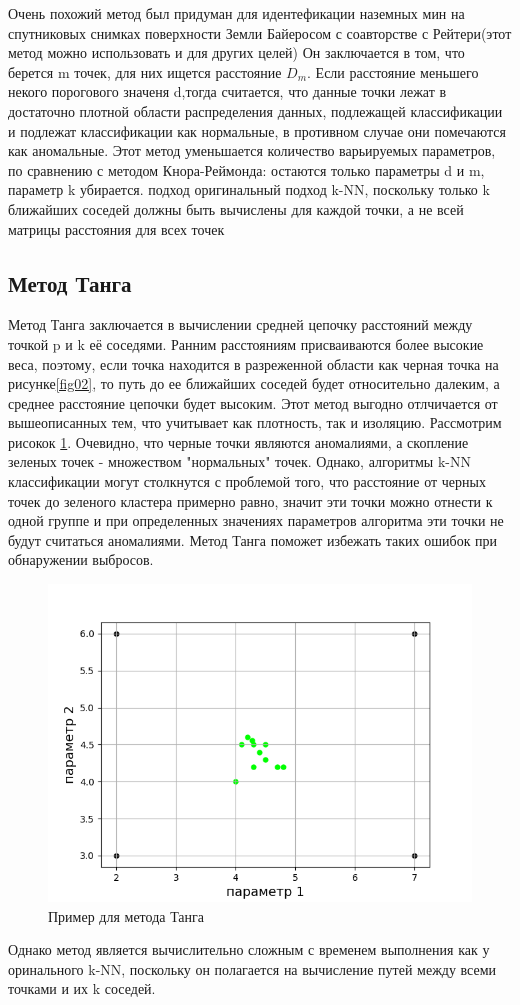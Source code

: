   Очень похожий метод был придуман для идентефикации  наземных мин  на спутниковых снимках поверхности Земли Байеросом с соавторстве с Рейтери\cite{Book10}(этот метод можно использовать и для других целей) Он заключается в том, что берется m точек, для них ищется расстояние $D_m$. Если расстояние меньшего некого порогового значеня d,тогда  считается, что  данные точки лежат в достаточно плотной области распределения данных, подлежащей классификации и подлежат классификации как нормальные, в противном случае они помечаются как аномальные. Этот метод уменьшается количество варьируемых параметров, по сравнению с методом Кнора-Реймонда: остаются только параметры d и m, параметр k убирается. 
  подход оригинальный подход k-NN, поскольку только k ближайших соседей должны быть вычислены для каждой точки, а не всей матрицы расстояния
  для всех точек
\subsection{Метод Танга}
Метод Танга заключается  в вычислении средней цепочку расстояний между точкой p и k её соседями. Ранним расстояниям присваиваются более высокие веса, поэтому, если точка находится в разреженной
области как черная точка на рисунке\ref{fig02}, то путь до  ее ближайших соседей  будет относительно далеким, а среднее расстояние цепочки
будет высоким. Этот метод выгодно отлчичается от вышеописанных тем, что учитывает как  плотность, так и изоляцию. Рассмотрим рисокок \ref{fig03}.
Очевидно, что черные точки являются аномалиями, а скопление зеленых точек - множеством "нормальных" точек. Однако, алгоритмы k-NN классификации могут столкнутся с проблемой того, что расстояние от черных точек до зеленого кластера примерно равно, значит эти точки можно отнести к одной группе и при определенных значениях параметров алгоритма эти точки не будут считаться аномалиями. Метод Танга поможет избежать таких ошибок при обнаружении выбросов.
\begin{figure}
	\centering
	\includegraphics[width=.5\textwidth]{img/3.png}
	\caption{Пример для метода Танга}
	\label{fig03}
\end{figure}
 Однако метод является вычислительно сложным с временем выполнения как у оринального k-NN, поскольку он полагается на вычисление путей между всеми точками и их k соседей. 
